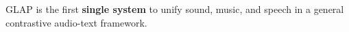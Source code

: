 GLAP is the first \textbf{single system} to unify sound, music, and speech in a general contrastive audio-text framework.

\vspace{2cm}
\begin{center}
\qrcode{\PosterRepositoryUrl}

\vspace{1.5cm}
\Large\textbf{\PosterRepositoryText}
\end{center}
